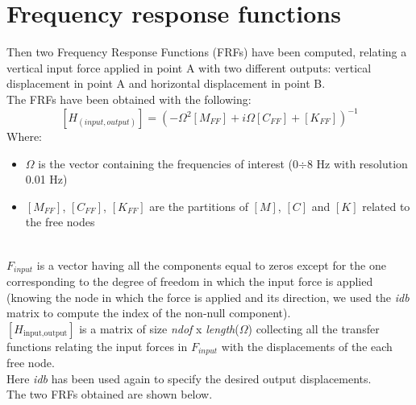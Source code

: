 \documentclass[20pt]{report}
\begin{document}
\section{Frequency response functions}

\noindent Then two Frequency Response Functions (FRFs) have been computed, relating a vertical input force applied in point A with two different outputs: vertical displacement in point A and horizontal displacement in point B.\\
The FRFs have been obtained with the following:
\begin{equation*}
 \left[ H_{(input,output)} \right] = \left(-\Omega^2 \left[M_{FF} \right]+i\Omega \left[C_{FF} \right]+\left[K_{FF}\right] \right)^{-1}
\end{equation*}
Where: 
\begin{itemize}
    \item $\Omega$ is the vector containing the frequencies of interest (0$\div$8 Hz with resolution 0.01 Hz)
    \item $\left[M_{FF}\right]$, $\left[C_{FF}\right]$, $\left[K_{FF}\right]$  are the partitions of $[M]$, $[C]$ and $[K]$ related to the free nodes
\end{itemize} 
\ \\
\noindent ${F_{input}}$ is a vector having all the components equal to zeros except for the one corresponding to the degree of freedom in which the input force is applied (knowing the node in which the force is applied and its direction, we used the \textit{idb} matrix to compute the index of the non-null component).\\
$[H_{\text{input,output}}]$ is a matrix of size \textit{ndof} x \textit{length}($\Omega$) collecting all the transfer functions relating the input forces in ${F_{input}}$ with the displacements of the each free node.\\
Here \textit{idb} has been used again to specify the desired output displacements.\\
The two FRFs obtained are shown below.

\end{document}
